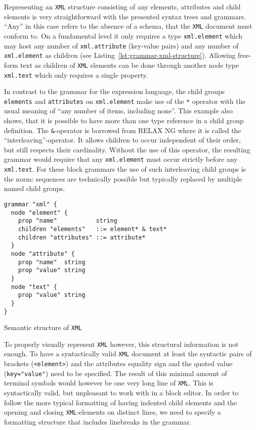 \documentclass[sigconf,natbib=false]{acmart}
\begin{document}
Representing an \texttt{XML} structure consisting of any elements, attributes and child elements is very straightforward with the presented syntax trees and grammars. \enquote{Any} in this case refers to the absence of a schema, that the \texttt{XML} document must conform to. On a fundamental level it only requires a type \texttt{xml.element} which may host any number of \texttt{xml.attribute} (key-value pairs) and any number of \texttt{xml.element} as children (see Listing~\ref{lst:grammar-xml-structure}). Allowing free-form text as children of \texttt{XML} elements can be done through another node type \texttt{xml.text} which only requires a single property.

In contrast to the grammar for the expression language, the child groups \texttt{elements} and \texttt{attributes} on \texttt{xml.element} make use of the \texttt{*} operator with the usual meaning of \enquote{any number of items, including none}. This example also shows, that it is possible to have more than one type reference in a child group definition. The \texttt{\&}-operator is borrowed from RELAX NG where it is called the \enquote{interleaving}-operator. It allows children to occur independent of their order, but still respects their cardinality. Without the use of this operator, the resulting grammar would require that any \texttt{xml.element} must occur strictly before any \texttt{xml.text}. For these block grammars the use of such interleaving child groups is the norm: sequences are technically possible but typically replaced by multiple named child groups.

\begin{listing}[H]
\begin{verbatim}
grammar "xml" {
  node "element" {
    prop "name"           string
    children "elements"   ::= element* & text*
    children "attributes" ::= attribute*
  }
  node "attribute" {
    prop "name"  string
    prop "value" string
  }
  node "text" {
    prop "value" string
  }
}
\end{verbatim}
\caption{Semantic structure of \texttt{XML}}
\label{lst:grammar-xml-structure}
\end{listing}

To properly visually represent \texttt{XML} however, this structural information is not enough. To have a syntactically valid \texttt{XML} document at least the syntactic pairs of brackets (\texttt{<element>}) and the attributes equality sign and the quoted value (\texttt{key="value"}) need to be specified. The result of this minimal amount of terminal symbols would however be one very long line of \texttt{XML}. This is syntactically valid, but unpleasant to work with in a block editor. In order to follow the more typical formatting of having indented child elements and the opening and closing \texttt{XML}-elements on distinct lines, we need to specify a formatting structure that includes linebreaks in the grammar.
\end{document}
